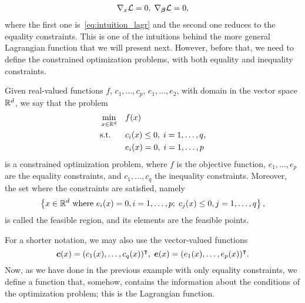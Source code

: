 \begin{equation}\nonumber
    \begin{aligned}
        \nabla_x {\mathcal{L}}= 0, \; \nabla_{\bm{\beta}} {\mathcal{L}}= 0,
    \end{aligned}
\end{equation}
where the first one is~\eqref{eq:intuition_lagr} and the second one reduces to the equality constraints.
This is one of the intuitions behind the more general Lagrangian function that we will present next. 
However, before that, we need to define the constrained optimization problems, with both equality and inequality constraints.
\begin{definition}
    Given real-valued functions $f$, $c_1, \ldots, c_p$, $e_1, \ldots, e_2$, with domain in the vector space $\mathbb{R}^d$,
    we say that the problem
    \begin{equation}\label{eq:optproblem_def}
        \begin{aligned}
            &\min_{x \in \reals^d} & & f(x) \\
            & \text{s.t.} & & c_i(x) \leq 0,\; i=1, \ldots, q , \\
            & & & e_i(x) = 0,\; i=1, \ldots, p              
        \end{aligned}
    \end{equation}
    is a constrained optimization problem, where $f$ is the objective function, $e_1, \ldots, e_p$ are the equality constraints, and $c_1, \ldots, c_q$ the inequality constraints.
    Moreover, the set where the constraints are satisfied, namely
    \begin{equation}
        \nonumber
        \left\{x \in \mathbb{R}^d \text{ where } e_i(x)=0, i=1, \ldots, p; \; c_j(x)\leq 0, j=1, \ldots, q\right\} ,
    \end{equation}
    is called the feasible region, and its elements are the feasible points.
\end{definition}
For a shorter notation, we may also use the vector-valued functions 
$$\bm{c}(x) = (c_1(x), \ldots, c_q(x))^\intercal, \; \bm{e}(x) = (e_1(x), \ldots, e_p(x))^\intercal .   $$
Now, as we have done in the previous example with only equality constraints, we define a function that, somehow, contains the information about the conditions of the optimization problem; this is the Lagrangian function.

